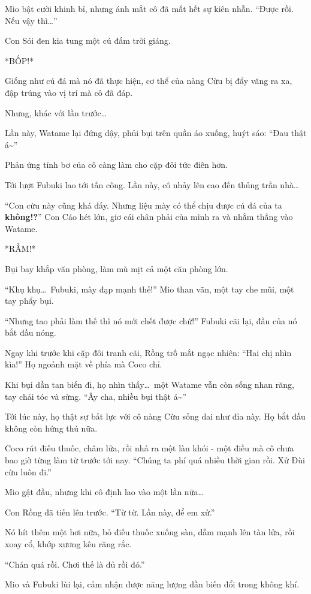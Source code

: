 \documentclass[../main.tex]{subfiles}
\begin{document}
Mio bật cười khinh bỉ, nhưng ánh mắt cô đã mất hết sự kiên nhẫn. ``Được rồi. Nếu vậy thì\dots''

Con Sói đen kia tung một cú đấm trời giáng.

*BỐP!*

Giống như cú đá mà nó đã thực hiện, cơ thể của nàng Cừu bị đẩy văng ra xa, đập trúng vào vị trí mà cô đã đáp.

Nhưng, khác với lần trước\dots

Lần này, Watame lại đứng dậy, phủi bụi trên quần áo xuống, huýt sáo: ``Đau thật á\~{}''

Phản ứng tỉnh bơ của cô càng làm cho cặp đôi tức điên hơn.

Tới lượt Fubuki lao tới tấn công. Lần này, cô nhảy lên cao đến thủng trần nhà\dots

``Con cừu này cũng khá đấy. Nhưng liệu mày có thể chịu được cú đá của ta \textbf{không!?}'' Con Cáo hét lớn, giơ cái chân phải của mình ra và nhắm thẳng vào Watame.

*RẦM!*

Bụi bay khắp văn phòng, làm mù mịt cả một căn phòng lớn.

``Khụ khụ\dots\ Fubuki, mày đạp mạnh thế!'' Mio than vãn, một tay che mũi, một tay phẩy bụi.

``Nhưng tao phải làm thế thì nó mới chết được chứ!'' Fubuki cãi lại, đầu của nó bắt đầu nóng.

Ngay khi trước khi cặp đôi tranh cãi, Rồng trố mắt ngạc nhiên: ``Hai chị nhìn kìa!'' Họ ngoảnh mặt về phía mà Coco chỉ.

Khi bụi dần tan biến đi, họ nhìn thấy\dots\ một Watame vẫn còn sống nhan răng, tay chải tóc và sừng. ``Ây cha, nhiều bụi thật á\~{}''

Tới lúc này, họ thật sự bất lực với cô nàng Cừu sống dai như đỉa này. Họ bắt đầu không còn hứng thú nữa.

Coco rút điếu thuốc, châm lửa, rồi nhả ra một làn khói - một điều mà cô chưa bao giờ từng làm từ trước tới nay. ``Chúng ta phí quá nhiều thời gian rồi. Xử Đùi cừu luôn đi.''

Mio gật đầu, nhưng khi cô định lao vào một lần nữa\dots

Con Rồng đã tiến lên trước. ``Từ từ. Lần này, để em xử.''

Nó hít thêm một hơi nữa, bỏ điếu thuốc xuống sàn, dẫm mạnh lên tàn lửa, rồi xoay cổ, khớp xương kêu răng rắc.

``Chán quá rồi. Chơi thế là đủ rồi đó.''

Mio và Fubuki lùi lại, cảm nhận được năng lượng dần biến đổi trong không khí.
\end{document}

